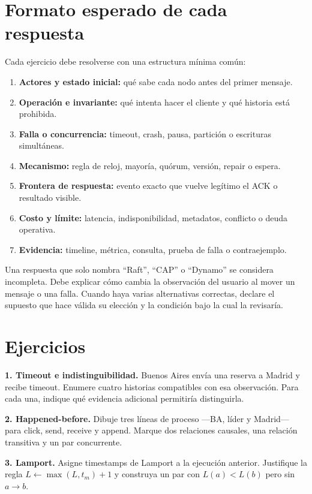\documentclass[variant=guia,cover=institutional,mode=screen]{ua-engineering-v6-article}
\begin{document}
\section{Formato esperado de cada respuesta}
Cada ejercicio debe resolverse con una estructura mínima común:
\begin{enumerate}
\item \textbf{Actores y estado inicial:} qué sabe cada nodo antes del primer mensaje.
\item \textbf{Operación e invariante:} qué intenta hacer el cliente y qué historia está prohibida.
\item \textbf{Falla o concurrencia:} timeout, crash, pausa, partición o escrituras simultáneas.
\item \textbf{Mecanismo:} regla de reloj, mayoría, quórum, versión, repair o espera.
\item \textbf{Frontera de respuesta:} evento exacto que vuelve legítimo el ACK o resultado visible.
\item \textbf{Costo y límite:} latencia, indisponibilidad, metadatos, conflicto o deuda operativa.
\item \textbf{Evidencia:} timeline, métrica, consulta, prueba de falla o contraejemplo.
\end{enumerate}
Una respuesta que solo nombra ``Raft'', ``CAP'' o ``Dynamo'' se considera incompleta. Debe explicar cómo cambia la observación del usuario al mover un mensaje o una falla. Cuando haya varias alternativas correctas, declare el supuesto que hace válida su elección y la condición bajo la cual la revisaría.

\section{Ejercicios}
\begin{uaexercise}
\textbf{1. Timeout e indistinguibilidad.} Buenos Aires envía una reserva a Madrid y recibe timeout. Enumere cuatro historias compatibles con esa observación. Para cada una, indique qué evidencia adicional permitiría distinguirla.
\end{uaexercise}

\begin{uaexercise}
\textbf{2. Happened-before.} Dibuje tres líneas de proceso ---BA, líder y Madrid--- para click, send, receive y append. Marque dos relaciones causales, una relación transitiva y un par concurrente.
\end{uaexercise}

\begin{uaexercise}
\textbf{3. Lamport.} Asigne timestamps de Lamport a la ejecución anterior. Justifique la regla $L\leftarrow\max(L,t_m)+1$ y construya un par con $L(a)<L(b)$ pero sin $a\rightarrow b$.
\end{uaexercise}
\end{document}
